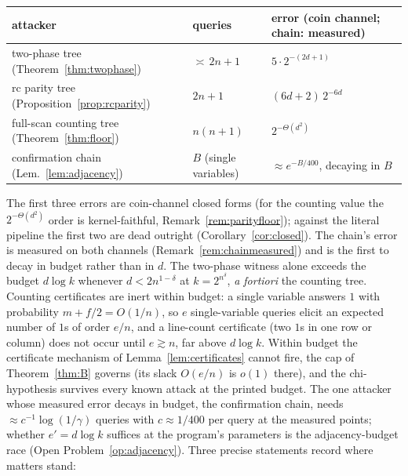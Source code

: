 \documentclass[11pt]{article}
\theoremstyle{definition}
\theoremstyle{remark}
\begin{document}
\begin{center}
\small
\begin{tabular}{lll}
\hline
attacker & queries & error (coin channel; chain: measured)\\
\hline
two-phase tree (Theorem~\ref{thm:twophase}) & $\asymp\,2n+1$ &
$5\cdot 2^{-(2d+1)}$\\
rc parity tree (Proposition~\ref{prop:rcparity}) & $2n+1$ &
$(6d+2)\,2^{-6d}$\\
full-scan counting tree (Theorem~\ref{thm:floor}) & $n(n+1)$ &
$2^{-\Theta(d^2)}$\\
confirmation chain (Lem.~\ref{lem:adjacency}) & $B$ (single variables) &
$\approx e^{-B/400}$, decaying in $B$\\
\hline
\end{tabular}
\end{center}

The first three errors are coin-channel closed forms (for the counting
value the $2^{-\Theta(d^2)}$ order is kernel-faithful,
Remark~\ref{rem:parityfloor}); against the literal pipeline the first
two are dead outright (Corollary~\ref{cor:closed}).  The chain's error
is measured on both channels (Remark~\ref{rem:chainmeasured}) and is
the first to decay in budget rather than in $d$.  The two-phase
witness alone exceeds the budget $d\log k$ whenever
$d<2n^{1-\delta}$ at $k=2^{n^{\delta}}$, \emph{a fortiori} the counting
tree.  Counting certificates are inert within budget: a single
variable answers $1$ with probability $m+f/2=O(1/n)$, so $e$
single-variable queries elicit an expected number of $1$s of order
$e/n$, and a line-count certificate (two $1$s in one row or column)
does not occur until $e\gtrsim n$, far above $d\log k$.  Within budget
the certificate mechanism of Lemma~\ref{lem:certificates} cannot fire,
the cap of Theorem~\ref{thm:B} governs (its slack $O(e/n)$ is $o(1)$
there), and the chi-hypothesis survives every known attack at the
printed budget.  The one attacker whose measured error decays in
budget, the confirmation chain, needs $\approx c^{-1}\log(1/\gamma)$
queries with $c\approx1/400$ per query at the measured points; whether
$e'=d\log k$ suffices at the program's parameters is the
adjacency-budget race (Open Problem~\ref{op:adjacency}).  Three
precise statements record where matters stand:
\end{document}
